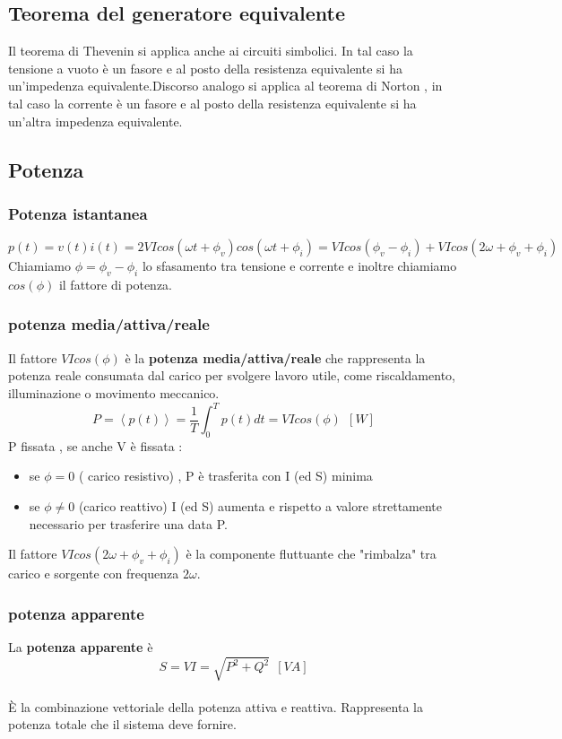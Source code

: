 \documentclass{article}
\theoremstyle{definition}
\begin{document}
\subsection{Teorema del generatore equivalente}
Il teorema di Thevenin si applica anche ai circuiti simbolici. In tal caso la tensione a vuoto è un fasore  e al posto della resistenza equivalente si ha un'impedenza equivalente.Discorso analogo si applica al  teorema di Norton , in tal caso la corrente è un fasore e al posto della resistenza equivalente si ha un'altra impedenza equivalente.
\subsection{Potenza}
\subsubsection{Potenza istantanea}
$$p(t)=v(t)i(t)=2VIcos(\omega t+\phi_v)cos(\omega t +\phi_i)=VIcos(\phi_v-\phi_i)+VIcos(2\omega+\phi_v+\phi_i)$$
Chiamiamo $\phi=\phi_v-\phi_i$ lo sfasamento tra tensione e corrente e inoltre chiamiamo $cos(\phi)$ il fattore di potenza.
\subsubsection{potenza media/attiva/reale}
Il fattore $VIcos(\phi)$ è la \textbf{potenza media/attiva/reale}  che rappresenta la potenza reale consumata dal carico per svolgere lavoro utile, come riscaldamento, illuminazione o movimento meccanico.
$$P=\left\langle p(t)\right\rangle =\frac{1}{T}\int_0^Tp(t)dt=VIcos(\phi)\ \ [W]$$
P fissata  , se anche V è fissata :
\begin{itemize}
	\item se $\phi=0$ ( carico resistivo) , P è trasferita con I (ed S) minima
	\item se $\phi\neq0$ (carico reattivo) I (ed S) aumenta e rispetto a valore strettamente necessario per trasferire una data P.
\end{itemize}
Il fattore $VIcos(2\omega+\phi_v+\phi_i)$ è la componente fluttuante che "rimbalza" tra carico e sorgente con frequenza $2\omega$.
\subsubsection{potenza apparente}
La \textbf{potenza apparente}  è $$S=VI=\sqrt{P^2+Q^2} \ \ [VA]$$\\
È la combinazione vettoriale della potenza attiva e reattiva. Rappresenta la potenza totale che il sistema deve fornire.
\end{document}
